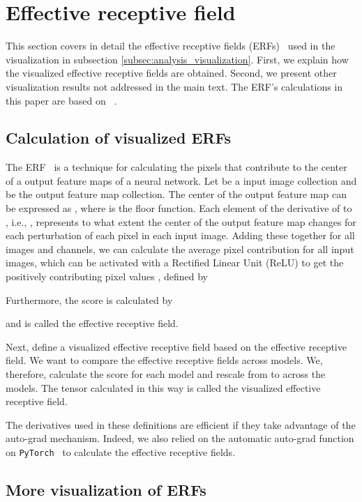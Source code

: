 \documentclass{article}
\begin{document}
\section{Effective receptive field}
\label{sec:erf_more}

This section covers in detail the effective receptive fields (ERFs)~\cite{luo2016understanding} used in the visualization in subsection \ref{subsec:analysis_visualization}. First, we explain how the visualized effective receptive fields are obtained. Second, we present other visualization results not addressed in the main text. The ERF's calculations in this paper are based on ~\cite{ding2022scaling}.

\subsection{Calculation of visualized ERFs}
\label{sub:calc_erf}

The ERF~\cite{luo2016understanding} is a technique for calculating the pixels that contribute to the center of a output feature maps of a neural network. Let  be a input image collection and  be the output feature map collection. The center of the output feature map can be expressed as , where  is the floor function. Each element of the derivative of  to , i.e., , represents to what extent the center of the output feature map changes for each perturbation of each pixel in each input image. Adding these together for all images and channels, we can calculate the average pixel contribution for all input images, which can be activated with a Rectified Linear Unit (ReLU) to get the positively contributing pixel values , defined by

Furthermore, the score  is calculated by

and  is called the effective receptive field.

Next, define a visualized effective receptive field based on the effective receptive field. We want to compare the effective receptive fields across models. We, therefore, calculate the score  for each model and rescale  from  to  across the models. The tensor calculated in this way is called the visualized effective receptive field.

The derivatives used in these definitions are efficient if they take advantage of the auto-grad mechanism. Indeed, we also relied on the automatic auto-grad function on \texttt{PyTorch}~\cite{paszke2019pytorch} to calculate the effective receptive fields.

\subsection{More visualization of ERFs}
\label{sub:erf_viz}
\end{document}
